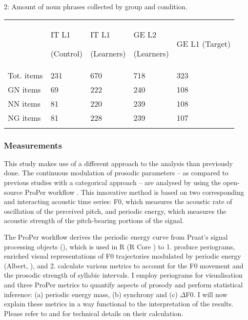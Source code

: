 \begin{stylelsTableHeading}%
\begin{table}
\caption{2: Amount of noun phrases collected by group and condition.}
\label{tab:key:4}
\end{table}\end{stylelsTableHeading}


\begin{tabularx}{\textwidth}{XXXXX}
 & IT L1 
\lsptoprule

(Control) & IT L1 

(Learners) & GE L2 

(Learners) & GE L1 (Target)\\
Tot. items & 231 & 670 & 718 & 323\\
GN items & 69 & 222 & 240 & 108\\
NN items & 81 & 220 & 239 & 108\\
NG items & 81 & 228 & 239 & 107\\
\lspbottomrule
\end{tabularx}
\subsubsection{}
\subsubsection{Measurements}
\hypertarget{Toc191305894}{}
This study makes use of a different approach to the analysis than previously done. The continuous modulation of prosodic parameters – as compared to previous studies with a categorical approach – are analysed by using the open-source ProPer workflow \citep{AlbertEtAl2020}. This innovative method is based on two corresponding and interacting acoustic time series: F0, which measures the acoustic rate of oscillation of the perceived pitch, and periodic energy, which measures the acoustic strength of the pitch-bearing portions of the signal. 

The ProPer workflow derives the periodic energy curve from Praat’s signal processing objects (\citealt{BoersmaWeenink2021}), which is used in R (R Core \citealt{Team2021}) to 1. produce periograms, enriched visual representations of F0 trajectories modulated by periodic energy (Albert, \citealt{CangemiGrice2018}), and 2. calculate various metrics to account for the F0 movement and the prosodic strength of syllabic intervals. I employ periograms for visualisation and three ProPer metrics to quantify aspects of prosody and perform statistical inference: (a) periodic energy mass, (b) synchrony and (c) ${\Delta}$F0. I will now explain these metrics in a way functional to the interpretation of the results. Please refer to \citet{SbrannaEtAl2023} and \citet{SbrannaEtAl2025} for technical details on their calculation.

